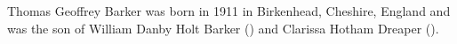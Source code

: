 
Thomas Geoffrey Barker was born in 1911 in Birkenhead, Cheshire, England and was the son of William Danby Holt Barker () and Clarissa Hotham Dreaper ().	


